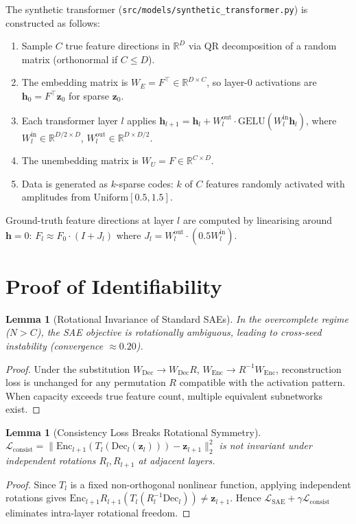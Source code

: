 \documentclass[12pt,a4paper]{article}
\newtheorem{lemma}[theorem]{Lemma}
\newcommand{\RR}{\mathbb{R}}
\newcommand{\bz}{\mathbf{z}}
\newcommand{\bh}{\mathbf{h}}
\newcommand{\Enc}{\mathrm{Enc}}
\newcommand{\Dec}{\mathrm{Dec}}
\begin{document}
The synthetic transformer (\texttt{src/models/synthetic\_transformer.py}) is constructed as follows:
\begin{enumerate}
  \item Sample $C$ true feature directions in $\RR^D$ via QR decomposition of a random matrix (orthonormal if $C \leq D$).
  \item The embedding matrix is $W_E = F^\top \in \RR^{D \times C}$, so layer-0 activations are $\bh_0 = F^\top \bz_0$ for sparse $\bz_0$.
  \item Each transformer layer $l$ applies $\bh_{l+1} = \bh_l + W_l^{\mathrm{out}} \cdot \mathrm{GELU}(W_l^{\mathrm{in}} \bh_l)$, where $W_l^{\mathrm{in}} \in \RR^{D/2 \times D}$, $W_l^{\mathrm{out}} \in \RR^{D \times D/2}$.
  \item The unembedding matrix is $W_U = F \in \RR^{C \times D}$.
  \item Data is generated as $k$-sparse codes: $k$ of $C$ features randomly activated with amplitudes from $\mathrm{Uniform}[0.5, 1.5]$.
\end{enumerate}
Ground-truth feature directions at layer $l$ are computed by linearising around $\bh = 0$: $F_l \approx F_0 \cdot (I + J_l)$ where $J_l = W_l^{\mathrm{out}} \cdot (0.5 W_l^{\mathrm{in}})$.

\section{Proof of Identifiability}
\label{app:proof}

\begin{lemma}[Rotational Invariance of Standard SAEs]
In the overcomplete regime ($N > C$), the SAE objective is rotationally ambiguous, leading to cross-seed instability (convergence $\approx 0.20$).
\end{lemma}
\begin{proof}
Under the substitution $W_{\Dec} \to W_{\Dec} R$, $W_{\Enc} \to R^{-1} W_{\Enc}$, reconstruction loss is unchanged for any permutation $R$ compatible with the activation pattern. When capacity exceeds true feature count, multiple equivalent subnetworks exist.
\end{proof}

\begin{lemma}[Consistency Loss Breaks Rotational Symmetry]
$\mathcal{L}_{\mathrm{consist}} = \|\Enc_{l+1}(T_l(\Dec_l(\bz_l))) - \bz_{l+1}\|_2^2$ is not invariant under independent rotations $R_l, R_{l+1}$ at adjacent layers.
\end{lemma}
\begin{proof}
Since $T_l$ is a fixed non-orthogonal nonlinear function, applying independent rotations gives $\Enc_{l+1} R_{l+1}(T_l(R_l^{-1} \Dec_l)) \neq \bz_{l+1}$. Hence $\mathcal{L}_{\mathrm{SAE}} + \gamma \mathcal{L}_{\mathrm{consist}}$ eliminates intra-layer rotational freedom.
\end{proof}
\end{document}
